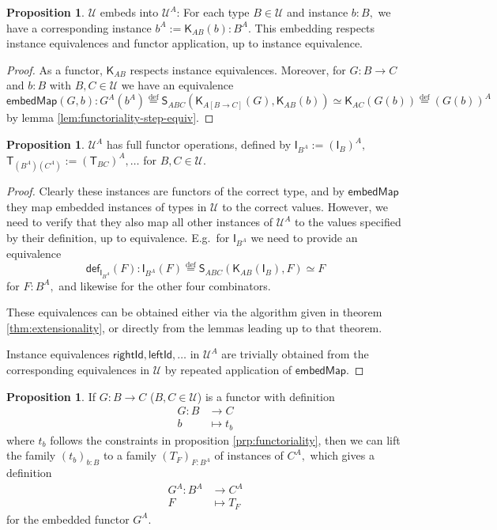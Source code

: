 \documentclass[a4paper]{article}
\theoremstyle{definition}
\newtheorem{proposition}[definition]{Proposition}
\theoremstyle{remark}
\renewcommand{\equiv}{\simeq}
\newcommand{\U}{\mathcal{U}}
\newcommand{\nm}{\mathsf}
\newcommand{\fndef}[1]{\nm{def}_{#1}}
\newcommand{\combinator}{\nm}
\newcommand{\idFun}{\combinator{I}}
\newcommand{\revAppFun}{\combinator{T}}
\newcommand{\constFun}{\combinator{K}}
\newcommand{\revSubstFun}{\combinator{S}}
\newcommand{\eqDef}{\overset{\text{def}}{=}}
\begin{document}
\begin{proposition}
  \label{prp:fun-univ-embed-map}
  $\U$ embeds into $\U^A$: For each type $B \in \U$ and instance $b : B,$ we have
  a corresponding instance $b^A := \constFun_{AB}(b) : B^A.$ This embedding
  respects instance equivalences and functor application, up to instance equivalence.
\end{proposition}
\vspace{-1ex}
\begin{proof}
  As a functor, $\constFun_{AB}$ respects instance equivalences.
  Moreover, for $G : B \to C$ and $b : B$ with $B,C \in \U$ we have an equivalence
  \[\nm{embedMap}(G,b) : G^A(b^A) \eqDef \revSubstFun_{ABC}(\constFun_{A[B{\to}C]}(G),\constFun_{AB}(b)) \equiv
    \constFun_{AC}(G(b)) \eqDef (G(b))^A\]
  by lemma \ref{lem:functoriality-step-equiv}.
\end{proof}

\begin{proposition}
  \label{prp:fun-univ-full-funop}
  $\U^A$ has full functor operations, defined by $\idFun_{B^A} := (\idFun_B)^A,$
  $\revAppFun_{(B^A)(C^A)} := (\revAppFun_{BC})^A, \ldots$ for $B,C \in \U.$
\end{proposition}
\vspace{-1ex}
\begin{proof}
  Clearly these instances are functors of the correct type, and by $\nm{embedMap}$
  they map embedded instances of types in $\U$ to the correct values. However, we
  need to verify that they also map all other instances of $\U^A$ to the values
  specified by their definition, up to equivalence. E.g.\ for $\idFun_{B^A}$ we
  need to provide an equivalence
  \[\fndef{\idFun_{B^A}}(F) : \idFun_{B^A}(F) \eqDef \revSubstFun_{ABC}(\constFun_{AB}(\idFun_B),F) \equiv F\]
  for $F : B^A,$ and likewise for the other four combinators.

  These equivalences can be obtained either via the algorithm given in theorem
  \ref{thm:extensionality}, or directly from the lemmas leading up to that theorem.

  Instance equivalences $\nm{rightId}, \nm{leftId}, \ldots$ in $\U^A$ are trivially
  obtained from the corresponding equivalences in $\U$ by repeated application of
  $\nm{embedMap}.$
\end{proof}

\begin{proposition}
  \label{prp:fun-univ-lift-fun}
  If $G : B \to C$ ($B,C \in \U$) is a functor with definition
  \begin{align*}
    G : B &\to     C\\
        b &\mapsto t_b
  \end{align*}
  where $t_b$ follows the constraints in proposition \ref{prp:functoriality},
  then we can lift the family $(t_b)_{b : B}$ to a family $(T_F)_{F : B^A}$ of
  instances of $C^A,$ which gives a definition
  \begin{align*}
    G^A : B^A &\to     C^A\\
          F   &\mapsto T_F
  \end{align*}
  for the embedded functor $G^A.$
\end{proposition}
\end{document}
